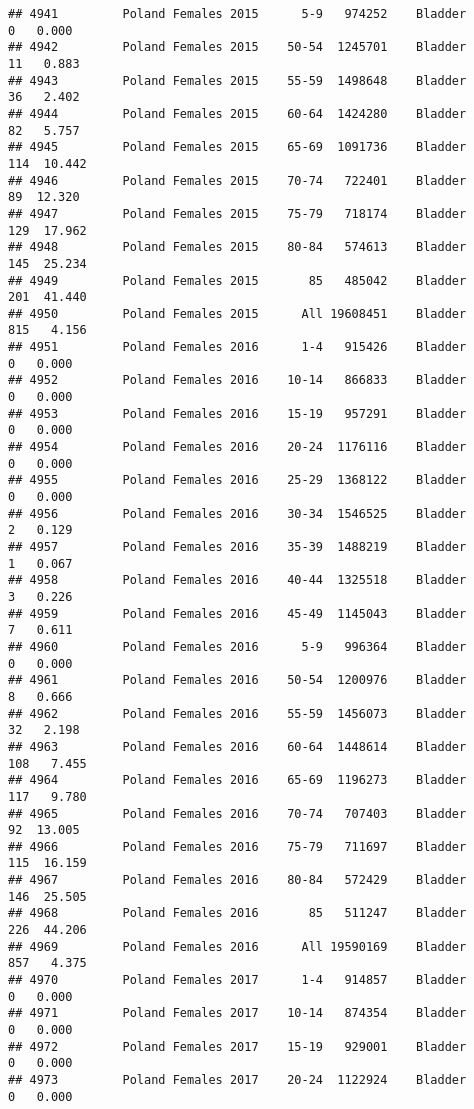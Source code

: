 \documentclass[
]{article}
\begin{document}
\begin{verbatim}
## 4941         Poland Females 2015      5-9   974252    Bladder      0   0.000
## 4942         Poland Females 2015    50-54  1245701    Bladder     11   0.883
## 4943         Poland Females 2015    55-59  1498648    Bladder     36   2.402
## 4944         Poland Females 2015    60-64  1424280    Bladder     82   5.757
## 4945         Poland Females 2015    65-69  1091736    Bladder    114  10.442
## 4946         Poland Females 2015    70-74   722401    Bladder     89  12.320
## 4947         Poland Females 2015    75-79   718174    Bladder    129  17.962
## 4948         Poland Females 2015    80-84   574613    Bladder    145  25.234
## 4949         Poland Females 2015       85   485042    Bladder    201  41.440
## 4950         Poland Females 2015      All 19608451    Bladder    815   4.156
## 4951         Poland Females 2016      1-4   915426    Bladder      0   0.000
## 4952         Poland Females 2016    10-14   866833    Bladder      0   0.000
## 4953         Poland Females 2016    15-19   957291    Bladder      0   0.000
## 4954         Poland Females 2016    20-24  1176116    Bladder      0   0.000
## 4955         Poland Females 2016    25-29  1368122    Bladder      0   0.000
## 4956         Poland Females 2016    30-34  1546525    Bladder      2   0.129
## 4957         Poland Females 2016    35-39  1488219    Bladder      1   0.067
## 4958         Poland Females 2016    40-44  1325518    Bladder      3   0.226
## 4959         Poland Females 2016    45-49  1145043    Bladder      7   0.611
## 4960         Poland Females 2016      5-9   996364    Bladder      0   0.000
## 4961         Poland Females 2016    50-54  1200976    Bladder      8   0.666
## 4962         Poland Females 2016    55-59  1456073    Bladder     32   2.198
## 4963         Poland Females 2016    60-64  1448614    Bladder    108   7.455
## 4964         Poland Females 2016    65-69  1196273    Bladder    117   9.780
## 4965         Poland Females 2016    70-74   707403    Bladder     92  13.005
## 4966         Poland Females 2016    75-79   711697    Bladder    115  16.159
## 4967         Poland Females 2016    80-84   572429    Bladder    146  25.505
## 4968         Poland Females 2016       85   511247    Bladder    226  44.206
## 4969         Poland Females 2016      All 19590169    Bladder    857   4.375
## 4970         Poland Females 2017      1-4   914857    Bladder      0   0.000
## 4971         Poland Females 2017    10-14   874354    Bladder      0   0.000
## 4972         Poland Females 2017    15-19   929001    Bladder      0   0.000
## 4973         Poland Females 2017    20-24  1122924    Bladder      0   0.000

\end{verbatim}
\end{document}
